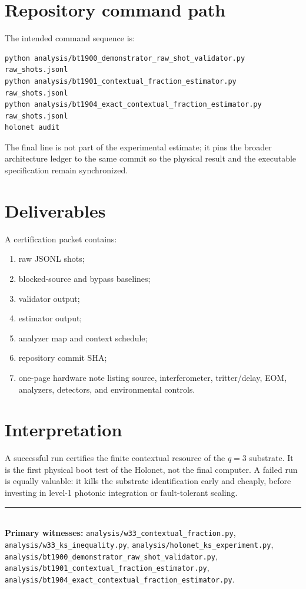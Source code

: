 \documentclass[11pt]{article}
\begin{document}
\section{Repository command path}
The intended command sequence is:
\begin{verbatim}
python analysis/bt1900_demonstrator_raw_shot_validator.py raw_shots.jsonl
python analysis/bt1901_contextual_fraction_estimator.py raw_shots.jsonl
python analysis/bt1904_exact_contextual_fraction_estimator.py raw_shots.jsonl
holonet audit
\end{verbatim}
The final line is not part of the experimental estimate; it pins the broader architecture ledger to the
same commit so the physical result and the executable specification remain synchronized.

\section{Deliverables}
A certification packet contains:
\begin{enumerate}[leftmargin=1.4em]
\item raw JSONL shots;
\item blocked-source and bypass baselines;
\item validator output;
\item estimator output;
\item analyzer map and context schedule;
\item repository commit SHA;
\item one-page hardware note listing source, interferometer, tritter/delay, EOM, analyzers, detectors, and environmental controls.
\end{enumerate}

\section{Interpretation}
A successful run certifies the finite contextual resource of the $q=3$ substrate.  It is the first physical
boot test of the Holonet, not the final computer.  A failed run is equally valuable: it kills the substrate
identification early and cheaply, before investing in level-1 photonic integration or fault-tolerant
scaling.

\bigskip
\noindent\rule{\linewidth}{0.4pt}\\[0.25em]
{\footnotesize \textbf{Primary witnesses:} \texttt{analysis/w33\_contextual\_fraction.py},
\texttt{analysis/w33\_ks\_inequality.py}, \texttt{analysis/holonet\_ks\_experiment.py},
\texttt{analysis/bt1900\_demonstrator\_raw\_shot\_validator.py},
\texttt{analysis/bt1901\_contextual\_fraction\_estimator.py},
\texttt{analysis/bt1904\_exact\_contextual\_fraction\_estimator.py}.}
\end{document}
